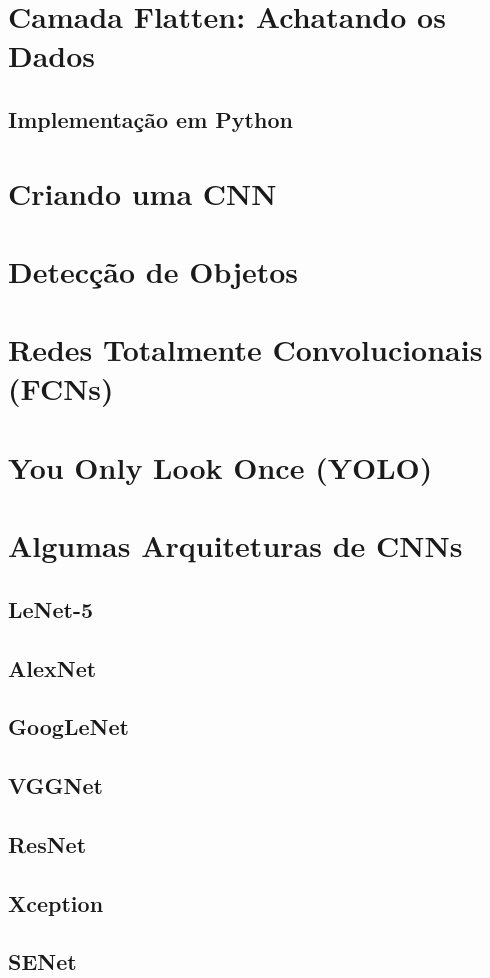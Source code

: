 \section{Camada Flatten: Achatando os Dados}

\subsection{Implementação em Python}

\section{Criando uma CNN}

\section{Detecção de Objetos}

\section{Redes Totalmente Convolucionais (FCNs)}

\section{You Only Look Once (YOLO)}

\section{Algumas Arquiteturas de CNNs}

\subsection{LeNet-5}

\subsection{AlexNet}

\subsection{GoogLeNet}

\subsection{VGGNet}

\subsection{ResNet}

\subsection{Xception}

\subsection{SENet}